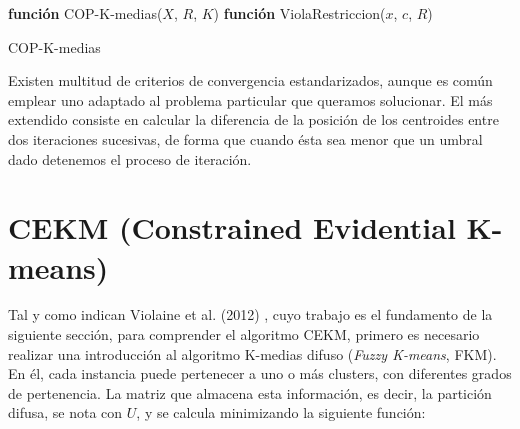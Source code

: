 \begin{algorithm}
	
	\BlankLine
	\BlankLine
	\textbf{función} COP-K-medias($X$, $R$, $K$) 
	\BlankLine
	\BlankLine
	\textbf{función} ViolaRestriccion($x$, $c$, $R$) 
	
	\caption{COP-K-medias}\label{alg:ckm}
\end{algorithm}

Existen multitud de criterios de convergencia estandarizados, aunque es común emplear uno adaptado al problema particular que queramos solucionar. El más extendido consiste en calcular la diferencia de la posición de los centroides entre dos iteraciones sucesivas, de forma que cuando ésta sea menor que un umbral dado detenemos el proceso de iteración.

\section{CEKM (Constrained Evidential K-means)} \label{cekm}

Tal y como indican Violaine et al. (2012) \cite{CECM:2012}, cuyo trabajo es el fundamento de la siguiente sección, para comprender el algoritmo  \acf{CEKM}, primero es necesario realizar una introducción al algoritmo K-medias difuso (\textit{Fuzzy K-means}, \acs{FKM}). En él, cada instancia puede pertenecer a uno o más clusters, con diferentes grados de pertenencia. La matriz que almacena esta información, es decir, la partición difusa, se nota con $U$, y se calcula minimizando la siguiente función:

